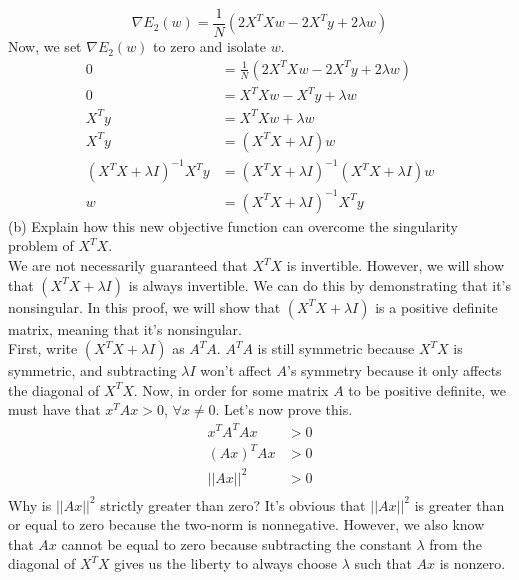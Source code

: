 \documentclass[12pt]{article}
\begin{document}
	\begin{equation*}
	\nabla E_2(w) = \frac{1}{N} (2X^T Xw-2X^T y + 2\lambda w)
	\end{equation*}
	Now, we set $\nabla E_2(w)$ to zero and isolate $w$.
	\begin{align*}
	0 &= \frac{1}{N} (2X^T Xw-2X^T y + 2\lambda w) \\
	0 &= X^T Xw-X^T y + \lambda w \\
	X^T y &= X^T X w + \lambda w	\\
	X^T y &= (X^T X + \lambda I)w \\
	(X^T X + \lambda I)^{-1}X^T y &=(X^T X+\lambda I)^{-1}(X^T X + \lambda I) w \\
	w&=(X^T X + \lambda I)^{-1}X^T y
	\end{align*}
	(b) Explain how this new objective function can overcome the singularity problem
	of $X^T X$. \\
	We are not necessarily guaranteed that $X^T X$ is invertible. However, we will show that $(X^T X + \lambda I)$ is always invertible. We can do this by demonstrating that it's nonsingular. In this proof, we will show that $(X^T X + \lambda I)$ is a positive definite matrix, meaning that it's nonsingular. \\
	First, write $(X^T X + \lambda I)$ as $A^T A$. $A^T A$ is still symmetric because $X^T X$ is symmetric, and subtracting $\lambda I$ won't affect $A$'s symmetry because it only affects the diagonal of $X^T X$. Now, in order for some matrix $A$ to be positive definite, we must have that $x^T Ax >0$, $\forall x \ne 0$. Let's now prove this.
	\begin{align*}
	x^T A^T A x &> 0 \\
	(Ax)^T Ax &> 0 \\
	||Ax||^2 &> 0 \\
	\end{align*}
	Why is $||Ax||^2$ strictly greater than zero? It's obvious that $||Ax||^2$ is greater than or equal to zero because the two-norm is nonnegative. However, we also know that $Ax$ cannot be equal to zero because subtracting the constant $\lambda$ from the diagonal of $X^T X$ gives us the liberty to always choose $\lambda$ such that $Ax$ is nonzero.
	\\
\end{document}
